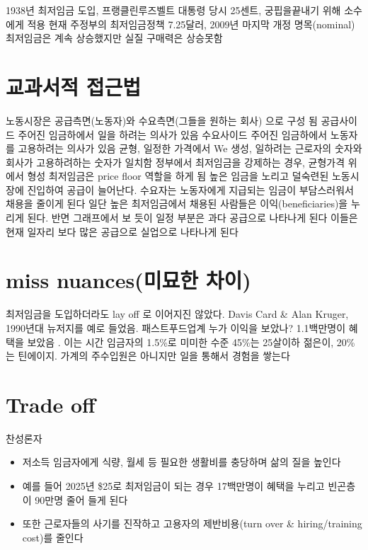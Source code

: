 \documentclass[
]{book}
\providecommand{\tightlist}{%
  \setlength{\itemsep}{0pt}\setlength{\parskip}{0pt}}
\begin{document}
1938년 최저임금 도입, 프랭클린루즈벨트 대통령
당시 25센트, 궁핍을끝내기 위해 소수에게 적용
현재 주정부의 최저임금정책 7.25달러, 2009년 마지막 개정
명목(nominal) 최저임금은 계속 상승했지만 실질 구매력은 상승못함

\hypertarget{uxad50uxacfcuxc11cuxc801-uxc811uxadfcuxbc95}{%
\section{교과서적 접근법}\label{uxad50uxacfcuxc11cuxc801-uxc811uxadfcuxbc95}}

노동시장은 공급측면(노동자)와 수요측면(그들을 원하는 회사) 으로 구성 됨
공급사이드 주어진 임금하에서 일을 하려는 의사가 있음
수요사이드 주어진 임금하에서 노동자를 고용하려는 의사가 있음
균형, 일정한 가격에서 We 생성, 일하려는 근로자의 숫자와 회사가 고용하려하는 숫자가 일치함
정부에서 최저임금을 강제하는 경우, 균형가격 위에서 형성 최저임금은 price floor 역할을 하게 됨
높은 임금을 노리고 덜숙련된 노동시장에 진입하여 공급이 늘어난다. 수요자는 노동자에게 지급되는 임금이 부담스러워서 채용을 줄이게 된다
일단 높은 최저임금에서 채용된 사람들은 이익(beneficiaries)을 누리게 된다. 반면 그래프에서 보 듯이 일정 부분은 과다 공급으로 나타나게 된다
이들은 현재 일자리 보다 많은 공급으로 실업으로 나타나게 된다

\hypertarget{miss-nuancesuxbbf8uxbb18uxd55c-uxcc28uxc774}{%
\section{miss nuances(미묘한 차이)}\label{miss-nuancesuxbbf8uxbb18uxd55c-uxcc28uxc774}}

최저임금을 도입하더라도 lay off 로 이어지진 않았다. Davis Card \& Alan Kruger, 1990년대 뉴저지를 예로 들었음. 패스트푸드업계
누가 이익을 보았나?
1.1백만명이 혜택을 보았음 . 이는 시간 임금자의 1.5\%로 미미한 수준
45\%는 25살이하 젊은이, 20\%는 틴에이지. 가계의 주수입원은 아니지만 일을 통해서 경험을 쌓는다

\hypertarget{trade-off}{%
\section{Trade off}\label{trade-off}}

찬성론자

\begin{itemize}
\tightlist
\item
  저소득 임금자에게 식량, 월세 등 필요한 생활비를 충당하며 삶의 질을 높인다
\item
  예를 들어 2025년 \$25로 최저임금이 되는 경우 17백만명이 혜택을 누리고 빈곤층이 90만명 줄어 들게 된다
\item
  또한 근로자들의 사기를 진작하고 고용자의 제반비용(turn over \& hiring/training cost)를 줄인다
\end{itemize}
\end{document}
